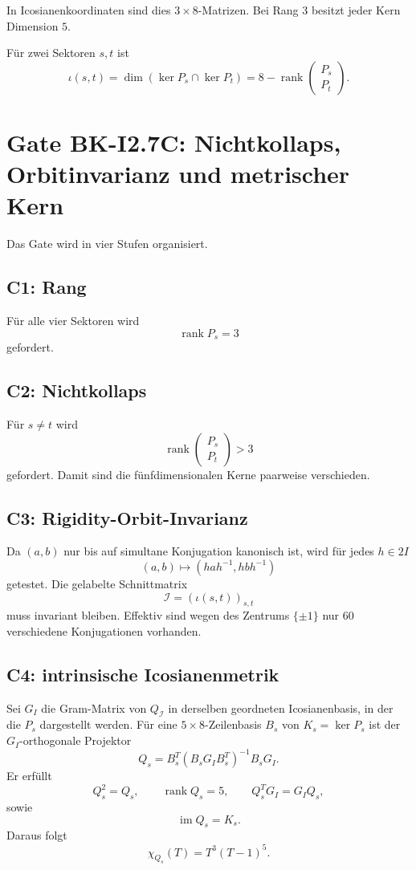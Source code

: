 \documentclass[11pt,a4paper]{article}
\theoremstyle{definition}
\theoremstyle{remark}
\newcommand{\QI}{Q_{\mathcal I}}
\begin{document}
In Icosianenkoordinaten sind dies $3\times8$-Matrizen. Bei Rang $3$ besitzt jeder Kern Dimension $5$.

Für zwei Sektoren $s,t$ ist
\[
\iota(s,t)
=
\dim(\ker P_s\cap\ker P_t)
=
8-\operatorname{rank}
\begin{pmatrix}
P_s\\P_t
\end{pmatrix}.
\]

\section{Gate BK-I2.7C: Nichtkollaps, Orbitinvarianz und metrischer Kern}
Das Gate wird in vier Stufen organisiert.

\subsection{C1: Rang}
Für alle vier Sektoren wird
\[
\operatorname{rank}P_s=3
\]
gefordert.

\subsection{C2: Nichtkollaps}
Für $s\neq t$ wird
\[
\operatorname{rank}
\begin{pmatrix}P_s\\P_t\end{pmatrix}>3
\]
gefordert. Damit sind die fünfdimensionalen Kerne paarweise verschieden.

\subsection{C3: Rigidity-Orbit-Invarianz}
Da $(a,b)$ nur bis auf simultane Konjugation kanonisch ist, wird für jedes $h\in2I$
\[
(a,b)\mapsto(hah^{-1},hbh^{-1})
\]
getestet. Die gelabelte Schnittmatrix
\[
\mathcal I=(\iota(s,t))_{s,t}
\]
muss invariant bleiben. Effektiv sind wegen des Zentrums $\{\pm1\}$ nur 60 verschiedene Konjugationen vorhanden.

\subsection{C4: intrinsische Icosianenmetrik}
Sei $G_I$ die Gram-Matrix von $\QI$ in derselben geordneten Icosianenbasis, in der die $P_s$ dargestellt werden. Für eine $5\times8$-Zeilenbasis $B_s$ von $K_s=\ker P_s$ ist der $G_I$-orthogonale Projektor
\[
\boxed{
Q_s=
B_s^T(B_sG_IB_s^T)^{-1}B_sG_I.
}
\]
Er erfüllt
\[
Q_s^2=Q_s,\qquad
\operatorname{rank}Q_s=5,\qquad
Q_s^TG_I=G_IQ_s,
\]
sowie
\[
\operatorname{im}Q_s=K_s.
\]
Daraus folgt
\[
\chi_{Q_s}(T)=T^3(T-1)^5.
\]
\end{document}
